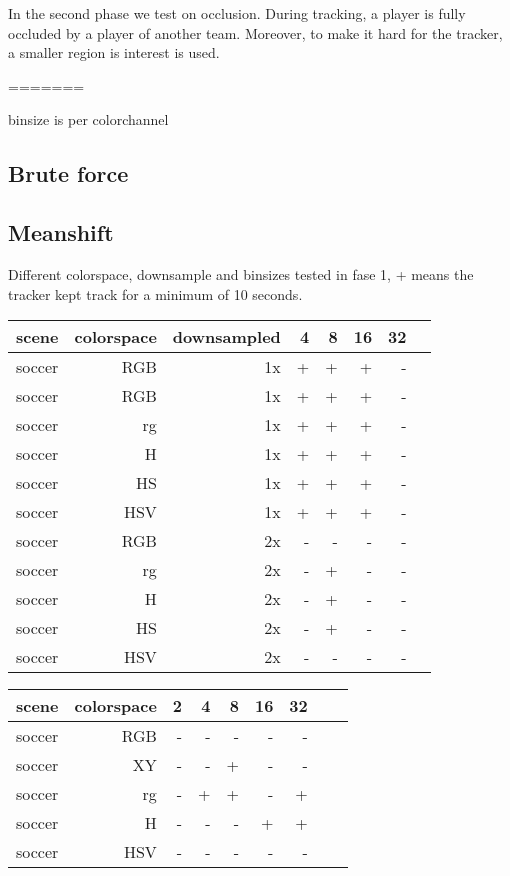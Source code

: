 \documentclass[a4paper,11pt]{article}
\begin{document}
	In the second phase we test on occlusion. During tracking, a player is fully
	occluded by a player of another team. Moreover, to make it hard for the
	tracker, a smaller region is interest is used. 




=======

	binsize is per colorchannel

	\subsection{Brute force} 

	\subsection{Meanshift} 

	Different colorspace, downsample and binsizes tested in fase 1, +
	means the tracker kept track for a minimum of 10 seconds. 
	\begin{tabular}{l*{7}{r|}}
		\label{table:fase1}
		scene	& 	colorspace	& downsampled & 4 & 8 & 16 & 32\\
		\hline
		soccer 	& 	RGB	 		& 1x		  			  & + & + & +  &  -\\
		soccer 	& 	RGB	 		& 1x		  			  & + & + & +  &  -\\
		soccer 	& 	rg	 		& 1x 		  			  & + & + & +  &  -\\
		soccer 	& 	H	 		& 1x		 			  & + & + & +  &  -\\
		soccer 	& 	HS	 		& 1x		  			  & + & + & +  &  -\\
		soccer 	& 	HSV	 		& 1x		  			  & + & + & +  &  -\\
		soccer 	& 	RGB	 		& 2x		  			  & - & - & -  &  -\\
		soccer 	& 	rg	 		& 2x 		  			  & - & + & -  &  -\\
		soccer 	& 	H	 		& 2x		  			  & - & + & -  &  -\\
		soccer 	& 	HS	 		& 2x		  			  & - & + & -  &  -\\
		soccer 	& 	HSV	 		& 2x		  			  & - & - & -  &  -\\

	\end{tabular}	

	\begin{tabular}{l*{8}{r|}}
		scene	& 	colorspace	&  2 & 4 & 8 & 16 & 32\\
		\hline
		soccer 	& 	RGB	 		&  - & - & - & - & -\\
		soccer 	& 	XY	 		&  - & - & + & - & -\\
		soccer 	& 	rg	 		&  - & + & + & - & +\\
		soccer 	& 	H	 		&  - & - & - & + & +\\
		soccer 	& 	HSV	 		&  - & - & - & - & -\\ 
	\end{tabular}	
\end{document}
